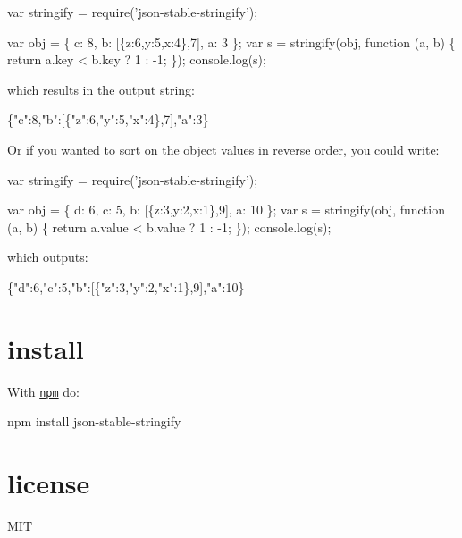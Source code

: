 \begin{DoxyCode}
var stringify = require('json-stable-stringify');

var obj = \{ c: 8, b: [\{z:6,y:5,x:4\},7], a: 3 \};
var s = stringify(obj, function (a, b) \{
    return a.key < b.key ? 1 : -1;
\});
console.log(s);
\end{DoxyCode}


which results in the output string\+:


\begin{DoxyCode}
\{"c":8,"b":[\{"z":6,"y":5,"x":4\},7],"a":3\}
\end{DoxyCode}


Or if you wanted to sort on the object values in reverse order, you could write\+:


\begin{DoxyCode}
var stringify = require('json-stable-stringify');

var obj = \{ d: 6, c: 5, b: [\{z:3,y:2,x:1\},9], a: 10 \};
var s = stringify(obj, function (a, b) \{
    return a.value < b.value ? 1 : -1;
\});
console.log(s);
\end{DoxyCode}


which outputs\+:


\begin{DoxyCode}
\{"d":6,"c":5,"b":[\{"z":3,"y":2,"x":1\},9],"a":10\}
\end{DoxyCode}


\section*{install}

With \href{https://npmjs.org}{\tt npm} do\+:


\begin{DoxyCode}
npm install json-stable-stringify
\end{DoxyCode}


\section*{license}

M\+IT 